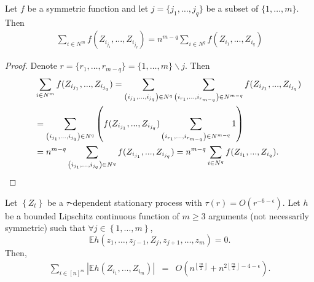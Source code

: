 \begin{lemma}
\label{lem:summingLema}
Let $f$ be a symmetric function and let $j=\{j_1,\ldots,j_q\}$ be a subset of $\{1,\ldots,m\}$. Then
\begin{align}
\sum_{i \in N^m} f(Z_{i_{j_1}},...,Z_{i_{j_q}}) = n^{m-q} \sum_{i \in N^q} f(Z_{i_1},...,Z_{i_q})
\end{align}
\end{lemma}
\begin{proof}
Denote $r=\{r_1,\ldots,r_{m-q}\}=\{1,\ldots,m\}\backslash j$. Then
\begin{align}
{}&\sum_{i \in N^m} f(Z_{i_{j_1}},...,Z_{i_{j_q}}) = \sum_{\left( i_{j_1},...,i_{j_q} \right) \in N^q}  \sum_{\left( i_{r_1},...,i_{r_{m-q}}\right) \in N^{m-q}} f(Z_{i_{j_1}},...,Z_{i_{j_q}}) \notag \\
\qquad&=\sum_{\left( i_{j_1},...,i_{j_q} \right) \in N^q}  \left( f(Z_{i_{j_1}},...,Z_{i_{j_q}})  \sum_{\left( i_{r_1},...,i_{r_{m-q}}\right) \in N^{m-q}} 1 \right) \notag \\
\qquad&= n^{m-q} \sum_{\left( i_{j_1},...,i_{j_q} \right) \in N^q}   f(Z_{i_{j_1}},...,Z_{i_{j_q}})  =n^{m-q} \sum_{i \in N^q} f(Z_{i_1},...,Z_{i_q})\notag.
\end{align}
\end{proof}

\begin{lemma}
\label{lem:boundLemma}
Let $\left\{ Z_{t}\right\} $ be a $\tau$-dependent stationary process
with $\tau(r)=O(r^{-6-\epsilon}).$ Let $h$ be a bounded Lipschitz
continuous function of $m\geq3$ arguments (not necessarily symmetric)
such that $\forall j\in\left\{ 1,\ldots,m\right\} $, 
\begin{equation}
\mathbb{E}h(z_{1},\ldots,z_{j-1},Z_{j},z_{j+1},\ldots,z_{m})=0.\label{eq: canonical_nonsymmetric}
\end{equation}
Then, 
\begin{eqnarray*}
\sum_{i\in[n]^{m}}\left|\mathbb{E}h\left(Z_{i_{1}},\ldots,Z_{i_{m}}\right)\right| & = & O\left(n^{\left\lfloor \frac{m}{2}\right\rfloor }+n^{2\left\lfloor \frac{m}{2}\right\rfloor -4-\epsilon}\right).
\end{eqnarray*}
\end{lemma}

